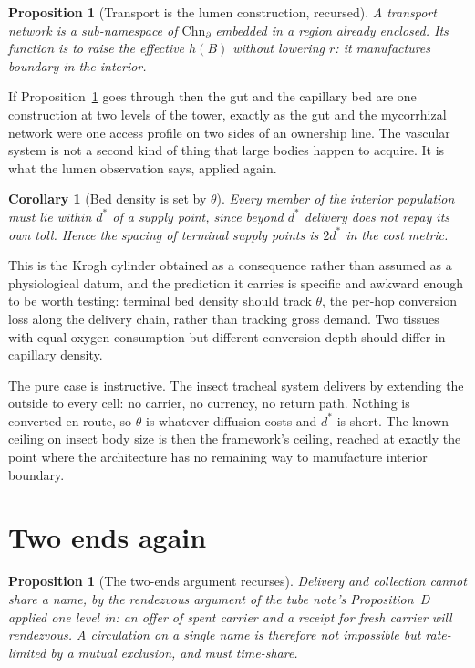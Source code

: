 \documentclass[11pt]{article}
\theoremstyle{plain}
\newtheorem{proposition}[theorem]{Proposition}
\newtheorem{corollary}[theorem]{Corollary}
\theoremstyle{definition}
\newcommand{\Chn}{\mathrm{Chn}}
\begin{document}
\begin{proposition}[Transport is the lumen construction, recursed]
\label{prop:K}
A transport network is a sub-namespace of $\Chn_{\partial}$ embedded in a region already enclosed. Its
function is to raise the effective $h(B)$ without lowering $r$: it manufactures boundary in the
interior.
\end{proposition}

If Proposition~\ref{prop:K} goes through then the gut and the capillary bed are one construction at
two levels of the tower, exactly as the gut and the mycorrhizal network were one access profile on
two sides of an ownership line. The vascular system is not a second kind of thing that large bodies
happen to acquire. It is what the lumen observation says, applied again.

\begin{corollary}[Bed density is set by $\theta$]
\label{cor:krogh}
Every member of the interior population must lie within $d^{*}$ of a supply point, since beyond
$d^{*}$ delivery does not repay its own toll. Hence the spacing of terminal supply points is
$2 d^{*}$ in the cost metric.
\end{corollary}

This is the Krogh cylinder \cite{krogh1919} obtained as a consequence rather than assumed as a
physiological datum, and the prediction it carries is specific and awkward enough to be worth testing:
terminal bed density should track $\theta$, the per-hop conversion loss along the delivery chain,
rather than tracking gross demand. Two tissues with equal oxygen consumption but different conversion
depth should differ in capillary density.

The pure case is instructive. The insect tracheal system delivers by extending the outside to every
cell: no carrier, no currency, no return path. Nothing is converted en route, so $\theta$ is whatever
diffusion costs and $d^{*}$ is short. The known ceiling on insect body size is then the framework's
ceiling, reached at exactly the point where the architecture has no remaining way to manufacture
interior boundary.

\section{Two ends again}
\label{sec:twoends}

\begin{proposition}[The two-ends argument recurses]
\label{prop:L}
Delivery and collection cannot share a name, by the rendezvous argument of the tube note's
Proposition~D applied one level in: an offer of spent carrier and a receipt for fresh carrier will
rendezvous. A circulation on a single name is therefore not impossible but rate-limited by a mutual
exclusion, and must time-share.
\end{proposition}
\end{document}
